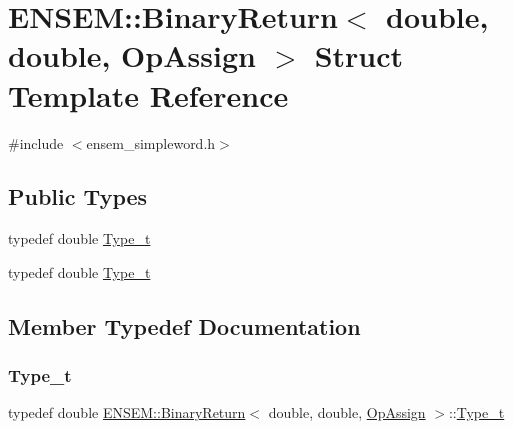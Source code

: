 \hypertarget{structENSEM_1_1BinaryReturn_3_01double_00_01double_00_01OpAssign_01_4}{}\section{E\+N\+S\+EM\+:\+:Binary\+Return$<$ double, double, Op\+Assign $>$ Struct Template Reference}
\label{structENSEM_1_1BinaryReturn_3_01double_00_01double_00_01OpAssign_01_4}


{\ttfamily \#include $<$ensem\+\_\+simpleword.\+h$>$}

\subsection*{Public Types}
\begin{DoxyCompactItemize}
\item 
typedef double \mbox{\hyperlink{structENSEM_1_1BinaryReturn_3_01double_00_01double_00_01OpAssign_01_4_a69cfbbe6186e9203aee261817f4b3dbd}{Type\+\_\+t}}
\item 
typedef double \mbox{\hyperlink{structENSEM_1_1BinaryReturn_3_01double_00_01double_00_01OpAssign_01_4_a69cfbbe6186e9203aee261817f4b3dbd}{Type\+\_\+t}}
\end{DoxyCompactItemize}


\subsection{Member Typedef Documentation}
\mbox{\label{structENSEM_1_1BinaryReturn_3_01double_00_01double_00_01OpAssign_01_4_a69cfbbe6186e9203aee261817f4b3dbd}} 
\subsubsection{\texorpdfstring{Type\_t}{Type\_t}\hspace{0.1cm}{\footnotesize\ttfamily [1/2]}}
{\footnotesize\ttfamily typedef double \mbox{\hyperlink{structENSEM_1_1BinaryReturn}{E\+N\+S\+E\+M\+::\+Binary\+Return}}$<$ double, double, \mbox{\hyperlink{structENSEM_1_1OpAssign}{Op\+Assign}} $>$\+::\mbox{\hyperlink{structENSEM_1_1BinaryReturn_3_01double_00_01double_00_01OpAssign_01_4_a69cfbbe6186e9203aee261817f4b3dbd}{Type\+\_\+t}}}

